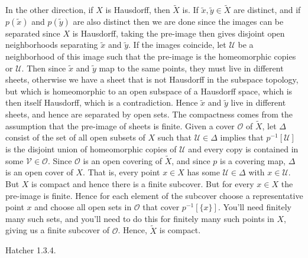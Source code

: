 \documentclass{article}                                                        %
\begin{document}
\begin{solution}
        \par\hfill\par
        In the other direction, if $X$ is Hausdorff, then $\tilde{X}$ is. If
        $\tilde{x},\tilde{y}\in\tilde{X}$ are distinct, and if $p(\tilde{x})$
        and $p(\tilde{y})$ are also distinct then we are done since the images
        can be separated since $X$ is Hausdorff, taking the pre-image then gives
        disjoint open neighborhoods separating $\tilde{x}$ and $\tilde{y}$. If
        the images coincide, let $\mathcal{U}$ be a neighborhood of this image
        such that the pre-image is the homeomorphic copies or $\mathcal{U}$.
        Then since $\tilde{x}$ and $\tilde{y}$ map to the same points, they must
        live in different sheets, otherwise we have a sheet that is not
        Hausdorff in the subspace topology, but which is homeomorphic to an open
        subspace of a Hausdorff space, which is then itself Hausdorff, which is
        a contradiction. Hence $\tilde{x}$ and $\tilde{y}$ live in different
        sheets, and hence are separated by open sets. The compactness comes from
        the assumption that the pre-image of sheets is finite. Given a cover
        $\mathcal{O}$ of $\tilde{X}$, let $\Delta$ consist of the set of all
        open subsets of $X$ such that $\mathcal{U}\in\Delta$ implies that
        $p^{\minus{1}}[\mathcal{U}]$ is the disjoint union of homeomorphic
        copies of $\mathcal{U}$ and every copy is contained in some
        $\mathcal{V}\in\mathcal{O}$. Since $\mathcal{O}$ is an open covering of
        $\tilde{X}$, and since $p$ is a covering map, $\Delta$ is an open cover
        of $X$. That is, every point $x\in{X}$ has some $\mathcal{U}\in\Delta$
        with $x\in\mathcal{U}$. But $X$ is compact and hence there is a finite
        subcover. But for every $x\in{X}$ the pre-image is finite. Hence for
        each element of the subcover choose a representative point $x$ and
        choose all open sets in $\mathcal{O}$ that cover $p^{\minus{1}}[\{x\}]$.
        You'll need finitely many such sets, and you'll need to do this for
        finitely many such points in $X$, giving us a finite subcover of
        $\mathcal{O}$. Hence, $\tilde{X}$ is compact.
    \end{solution}
    \begin{problem}
        \label{prob:Hatcher_1_3_4}%
        Hatcher 1.3.4.
    \end{problem}
\end{document}
